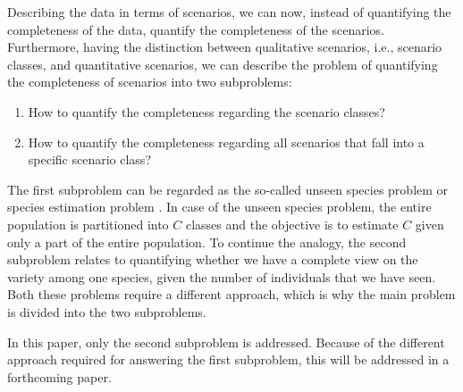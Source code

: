 Describing the data in terms of scenarios, we can now, instead of quantifying the completeness of the data, quantify the completeness of the scenarios. Furthermore, having the distinction between qualitative scenarios, i.e., scenario classes, and quantitative scenarios, we can describe the problem of quantifying the completeness of scenarios into two subproblems:
\begin{enumerate}
	\item How to quantify the completeness regarding the scenario classes?
	\item How to quantify the completeness regarding all scenarios that fall into a specific scenario class?
\end{enumerate}

The first subproblem can be regarded as the so-called unseen species problem \cite{bunge1993estimating} or species estimation problem \cite{yang2012estimating}. In case of the unseen species problem, the entire population is partitioned into $C$ classes and the objective is to estimate $C$ given only a part of the entire population. To continue the analogy, the second subproblem relates to quantifying whether we have a complete view on the variety among one species, given the number of individuals that we have seen. Both these problems require a different approach, which is why the main problem is divided into the two subproblems.

In this paper, only the second subproblem is addressed. Because of the different approach required for answering the first subproblem, this will be addressed in a forthcoming paper.
